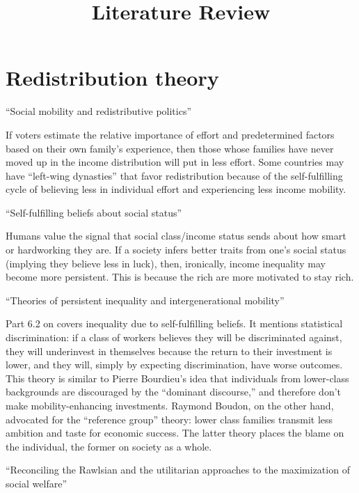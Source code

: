 \documentclass{article}
\title{Literature Review}
\author{}
\date{}
\begin{document}
\maketitle

\section*{Redistribution theory}

\noindent \textbf{\cite{piketty1995social}} ``Social mobility and redistributive politics''

If voters estimate the relative importance of effort and predetermined factors based on their own family’s experience, then those whose families have never moved up in the income distribution will put in less effort. Some countries may have ``left-wing dynasties'' that favor redistribution because of the self-fulfilling cycle of believing less in individual effort and experiencing less income mobility.

\medskip \noindent \textbf{\cite{piketty1998self}} ``Self-fulfilling beliefs about social status''

Humans value the signal that social class/income status sends about how smart or hardworking they are. If a society infers better traits from one’s social status (implying they believe less in luck), then, ironically, income inequality may become more persistent. This is because the rich are more motivated to stay rich.

\medskip \noindent \textbf{\cite{piketty2000theories}} ``Theories of persistent inequality and intergenerational mobility''

Part 6.2 on covers inequality due to self-fulfilling beliefs. It mentions statistical discrimination: if a class of workers believes they will be discriminated against, they will underinvest in themselves because the return to their investment is lower, and they will, simply by expecting discrimination, have worse outcomes. This theory is similar to Pierre Bourdieu’s idea that individuals from lower-class backgrounds are discouraged by the “dominant discourse,” and therefore don’t make mobility-enhancing investments. Raymond Boudon, on the other hand, advocated for the “reference group” theory: lower class families transmit less ambition and taste for economic success. The latter theory places the blame on the individual, the former on society as a whole.

\medskip \noindent \textbf{\cite{stark2014reconciling}} ``Reconciling the Rawlsian and the utilitarian approaches to the maximization of social welfare''
\end{document}
